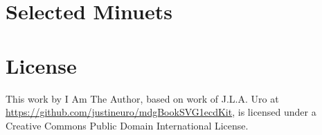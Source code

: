 \documentclass[letterpaper,x11names,svgnames,10pt]{article}
\begin{document}
\newpage
\section{Selected Minuets}
\vspace{-0.20in}
{
\topmargin -0.75in
\textheight 9.15in
	
}	

\newpage
\section{License}
This work by I Am The Author, based on work of J.L.A. Uro at \url{https://github.com/justineuro/mdgBookSVG1ecdKit}, is licensed under a Creative Commons Public Domain International License.




 
\end{document}
